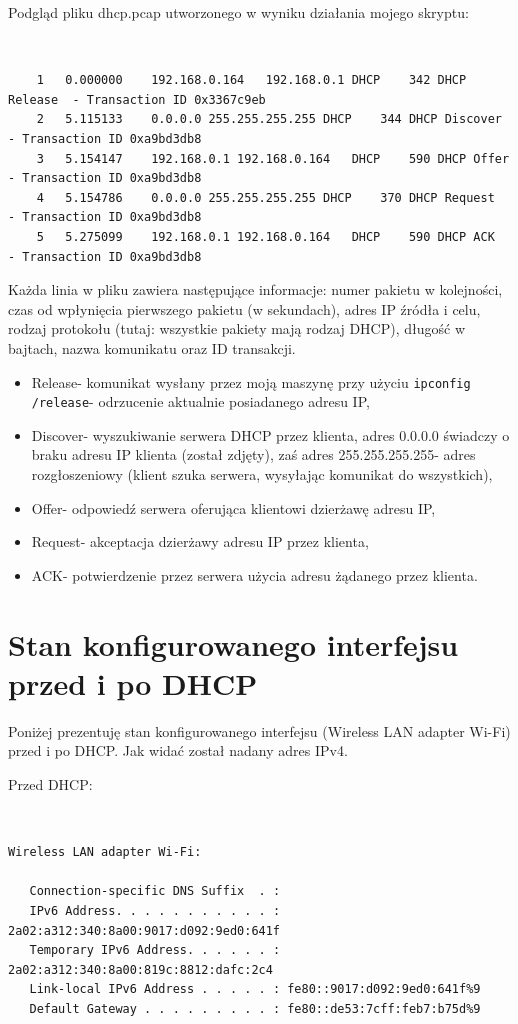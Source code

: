 \documentclass[a4paper,11pt]{article}
\begin{document}
Podgląd pliku dhcp.pcap utworzonego w wyniku działania mojego skryptu:

{\tt
\begin{verbatim}
    1	0.000000	192.168.0.164	192.168.0.1	DHCP	342	DHCP Release  - Transaction ID 0x3367c9eb
    2	5.115133	0.0.0.0	255.255.255.255	DHCP	344	DHCP Discover - Transaction ID 0xa9bd3db8
    3	5.154147	192.168.0.1	192.168.0.164	DHCP	590	DHCP Offer    - Transaction ID 0xa9bd3db8
    4	5.154786	0.0.0.0	255.255.255.255	DHCP	370	DHCP Request  - Transaction ID 0xa9bd3db8
    5	5.275099	192.168.0.1	192.168.0.164	DHCP	590	DHCP ACK      - Transaction ID 0xa9bd3db8
\end{verbatim}
}

Każda linia w pliku zawiera następujące informacje: numer pakietu w kolejności, czas od wpłynięcia pierwszego pakietu (w sekundach), adres IP źródła i celu, rodzaj protokołu (tutaj: wszystkie pakiety mają rodzaj DHCP), długość w bajtach, nazwa komunikatu oraz ID transakcji.

\begin{itemize}
    \item Release- komunikat wysłany przez moją maszynę przy użyciu {\tt ipconfig /release}- odrzucenie aktualnie posiadanego adresu IP,
    \item Discover- wyszukiwanie serwera DHCP przez klienta, adres 0.0.0.0 świadczy o braku adresu IP klienta (został zdjęty), zaś adres 255.255.255.255- adres rozgłoszeniowy (klient szuka serwera, wysyłając komunikat do wszystkich),
    \item Offer- odpowiedź serwera oferująca klientowi dzierżawę adresu IP,
    \item Request- akceptacja dzierżawy adresu IP przez klienta,
    \item ACK- potwierdzenie przez serwera użycia adresu żądanego przez klienta.
\end{itemize}

\section{Stan konfigurowanego interfejsu przed i po DHCP}

Poniżej prezentuję stan konfigurowanego interfejsu (Wireless LAN adapter Wi-Fi) przed i po DHCP. Jak widać został nadany adres IPv4.

Przed DHCP:

{\tt
\begin{verbatim}
Wireless LAN adapter Wi-Fi:

   Connection-specific DNS Suffix  . :
   IPv6 Address. . . . . . . . . . . : 2a02:a312:340:8a00:9017:d092:9ed0:641f
   Temporary IPv6 Address. . . . . . : 2a02:a312:340:8a00:819c:8812:dafc:2c4
   Link-local IPv6 Address . . . . . : fe80::9017:d092:9ed0:641f%9
   Default Gateway . . . . . . . . . : fe80::de53:7cff:feb7:b75d%9
   
\end{verbatim}
}
\end{document}

